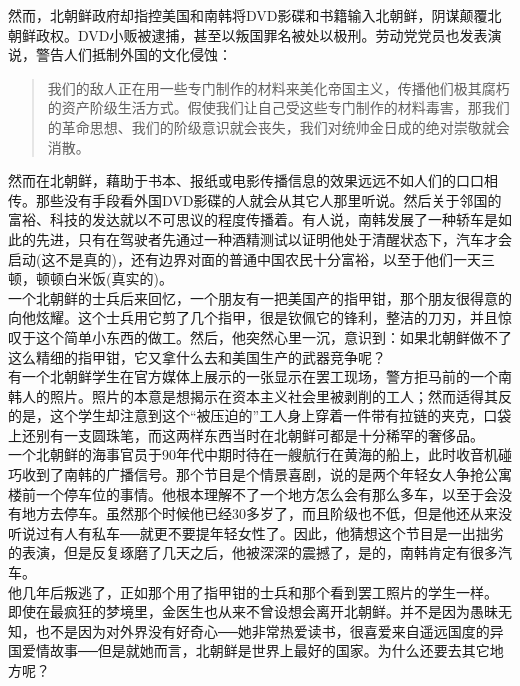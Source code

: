 然而，北朝鲜政府却指控美国和南韩将DVD影碟和书籍输入北朝鲜，阴谋颠覆北朝鲜政权。DVD小贩被逮捕，甚至以叛国罪名被处以极刑。劳动党党员也发表演说，警告人们抵制外国的文化侵蚀：\\

\begin{quote}
	我们的敌人正在用一些专门制作的材料来美化帝国主义，传播他们极其腐朽的资产阶级生活方式。假使我们让自己受这些专门制作的材料毒害，那我们的革命思想、我们的阶级意识就会丧失，我们对统帅金日成的绝对崇敬就会消散。\\
\end{quote}

然而在北朝鲜，藉助于书本、报纸或电影传播信息的效果远远不如人们的口口相传。那些没有手段看外国DVD影碟的人就会从其它人那里听说。然后关于邻国的富裕、科技的发达就以不可思议的程度传播着。有人说，南韩发展了一种轿车是如此的先进，只有在驾驶者先通过一种酒精测试以证明他处于清醒状态下，汽车才会启动(这不是真的)，还有边界对面的普通中国农民十分富裕，以至于他们一天三顿，顿顿白米饭(真实的)。\\

一个北朝鲜的士兵后来回忆，一个朋友有一把美国产的指甲钳，那个朋友很得意的向他炫耀。这个士兵用它剪了几个指甲，很是钦佩它的锋利，整洁的刀刃，并且惊叹于这个简单小东西的做工。然后，他突然心里一沉，意识到：如果北朝鲜做不了这么精细的指甲钳，它又拿什么去和美国生产的武器竞争呢？\\

有一个北朝鲜学生在官方媒体上展示的一张显示在罢工现场，警方拒马前的一个南韩人的照片。照片的本意是想揭示在资本主义社会里被剥削的工人；然而适得其反的是，这个学生却注意到这个“被压迫的”工人身上穿着一件带有拉链的夹克，口袋上还别有一支圆珠笔，而这两样东西当时在北朝鲜可都是十分稀罕的奢侈品。\\

一个北朝鲜的海事官员于90年代中期时待在一艘航行在黄海的船上，此时收音机碰巧收到了南韩的广播信号。那个节目是个情景喜剧，说的是两个年轻女人争抢公寓楼前一个停车位的事情。他根本理解不了一个地方怎么会有那么多车，以至于会没有地方去停车。虽然那个时候他已经30多岁了，而且阶级也不低，但是他还从来没听说过有人有私车──就更不要提年轻女性了。因此，他猜想这个节目是一出拙劣的表演，但是反复琢磨了几天之后，他被深深的震撼了，是的，南韩肯定有很多汽车。\\

他几年后叛逃了，正如那个用了指甲钳的士兵和那个看到罢工照片的学生一样。\\

即使在最疯狂的梦境里，金医生也从来不曾设想会离开北朝鲜。并不是因为愚昧无知，也不是因为对外界没有好奇心──她非常热爱读书，很喜爱来自遥远国度的异国爱情故事──但是就她而言，北朝鲜是世界上最好的国家。为什么还要去其它地方呢？\\

